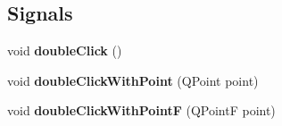 \subsection*{Signals}
\begin{DoxyCompactItemize}
\item 
\mbox{\label{class_q_qt_double_click_helper_a5422dada7d29d100a4c12b6ea4daf171}} 
void {\bfseries double\+Click} ()
\item 
\mbox{\label{class_q_qt_double_click_helper_a12f6bb662d2dbe55b6350de7d0005754}} 
void {\bfseries double\+Click\+With\+Point} (Q\+Point point)
\item 
\mbox{\label{class_q_qt_double_click_helper_af85935b407b5f020a7eb295ff5641c3c}} 
void {\bfseries double\+Click\+With\+PointF} (Q\+PointF point)
\end{DoxyCompactItemize}
